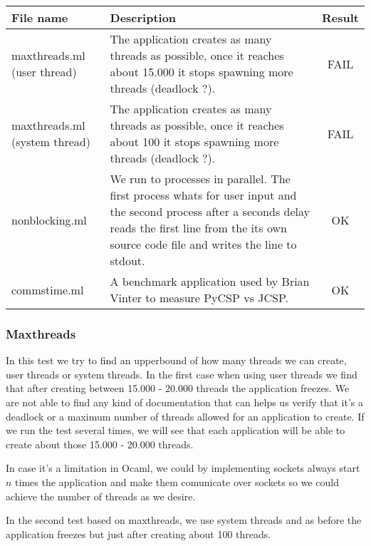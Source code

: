 \documentclass[a4paper,12pt]{article}
\begin{document}
\begin{tabular}{|p{3cm}|p{8.5cm}|c|}
    \hline
    	File name &
	Description &
	Result \\
    \hline
    	maxthreads.ml (user thread) &
        The application creates as many threads as possible, once it reaches
        about 15.000 it stops spawning more threads (deadlock ?).&
	FAIL \\
    \hline
    	maxthreads.ml (system thread) &
        The application creates as many threads as possible, once it reaches
        about 100 it stops spawning more threads (deadlock ?).&
	FAIL \\
    \hline
    	nonblocking.ml &
        We run to processes in parallel. The first process whats for user input
        and the second process after a seconds delay reads the first line from
        the its own source code file and writes the line to stdout.&
	OK \\
    \hline
    	commstime.ml &
        A benchmark application used by Brian Vinter to measure PyCSP vs JCSP.&
	OK \\
    \hline
  \end{tabular} 

\subsubsection*{Maxthreads}
In this test we try to find an upperbound of how many threads we can create,
user threads or system threads. In the first case when using user threads we
find that after creating between 15.000 - 20.000 threads the application
freezes. We are not able to find any kind of documentation that can helps us
verify that it's a deadlock or a maximum number of threads allowed for an
application to create. If we run the test several times, we will see that
each application will be able to create about those 15.000 - 20.000 threads.

In case it's a limitation in Ocaml, we could by implementing sockets always
start $n$ times the application and make them comunicate over sockets so we
could achieve the number of threads as we desire.

In the second test based on maxthreads, we use system threads and as before
the application freezes but just after creating about 100 threads.
\end{document}
